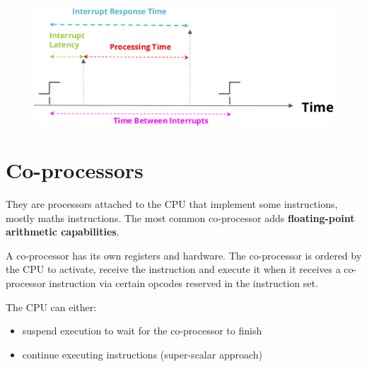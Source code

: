 \begin{figure}[H]
    \centering
    \includegraphics[width=0.85\linewidth]{img/image49.png}
\end{figure}

\section{Co-processors}

They are processors attached to the CPU that implement some instructions, mostly maths instructions. The
most common co-processor adds \textbf{floating-point arithmetic capabilities}.

A co-processor has its own registers and hardware. The co-processor is ordered by the CPU to activate, receive the instruction and execute it when it receives
a co-processor instruction via certain opcodes reserved in the instruction set.


The CPU can either:

\begin{itemize}
    \item suspend execution to wait for the co-processor to finish
    \item continue executing instructions (super-scalar approach)
\end{itemize}